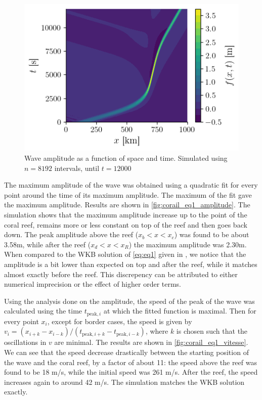 \begin{figure}[h]
    \centering
    \includegraphics[width=0.6\linewidth]{figures/corail_eq1_mouvement_vague.png}
    \caption{Wave amplitude as a function of space and time. Simulated using \(n=8192\) intervals, until \(t=12000\)}
    \label{fig:corail_eq1_mouv}
\end{figure}

The maximum amplitude of the wave was obtained using a quadratic fit for every point around the time of its maximum amplitude. The maximum of the fit gave the maximum amplitude. Results are shown in \autoref{fig:corail_eq1_amplitude}. The simulation shows that the maximum amplitude increase up to the point of the coral reef, remains more or less constant on top of the reef and then goes back down. The peak amplitude above the reef (\(x_b < x < x_c\)) was found to be about 3.58m, while after the reef (\(x_d<x<x_R\)) the maximum amplitude was 2.30m. When compared to the WKB solution of \autoref{eq:eq1} given in \cite{physnumbook}, we notice that the amplitude is a bit lower than expected on top and after the reef, while it matches almost exactly before the reef. This discrepency can be attributed to either numerical imprecision or the effect of higher order terms.

Using the analysis done on the amplitude, the speed of the peak of the wave was calculated using the time \(t_{\textrm{peak},i}\) at which the fitted function is maximal. Then for every point \(x_i\), except for border cases, the speed is given by \(v_i = (x_{i+k} - x_{i-k})/(t_{\textrm{peak},i+k} - t_{\textrm{peak},i-k})\), where \(k\) is chosen such that the oscillations in \(v\) are minimal. The results are shown in \autoref{fig:corail_eq1_vitesse}. We can see that the speed decrease drastically between the starting position of the wave and the coral reef, by a factor of about 11: the speed above the reef was found to be 18 m/s, while the initial speed was 261 m/s. After the reef, the speed increases again to around 42 m/s. The simulation matches the WKB solution exactly.

